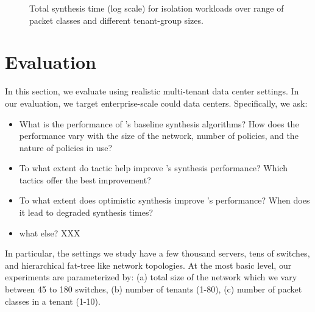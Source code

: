\begin{figure*}
	\centering
	\caption{\label{fig:isolation}
		Total synthesis time (log scale) for isolation workloads over range of packet classes and different tenant-group sizes.}
\end{figure*}

\section{Evaluation}
In this section, we evaluate \Name using 
realistic multi-tenant data
center settings. 
In our evaluation, we target enterprise-scale could data centers.
Specifically, we ask:

\begin{itemize}

\item What is the performance of \Name's baseline synthesis
  algorithms? How does the performance vary with the size of the
  network, number of policies, and the nature of policies in use?

\item To what extent do tactic help improve \Name's synthesis
  performance? Which tactics offer the best improvement?

\item To what extent does optimistic synthesis improve \Name's
  performance? When does it lead to degraded synthesis times?

\item what else? XXX

\end{itemize}

 In
particular, the settings we study have a few thousand servers, tens of
switches, and hierarchical fat-tree like network topologies. At the
most basic level, our experiments are parameterized by: (a) total size
of the network which we vary between 45 to 180 switches, (b) number of
tenants (1-80), (c) number of packet classes in a tenant (1-10). 

